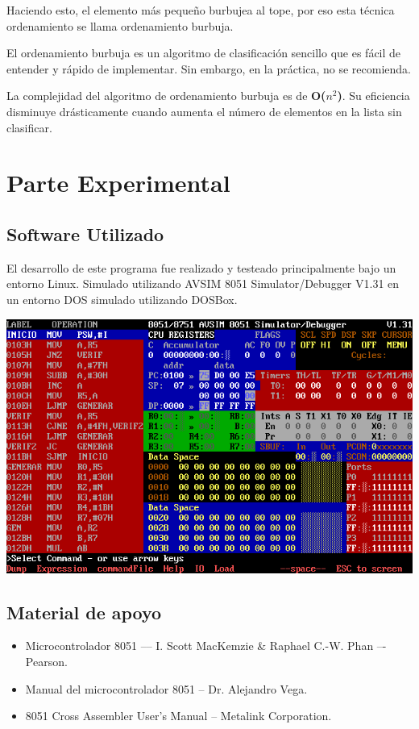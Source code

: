 \documentclass[doc, donotrepeattitle, biblatex, apacite]{apa6}
\begin{document}
Haciendo esto, el elemento más pequeño burbujea al tope, por eso esta técnica ordenamiento se
llama ordenamiento burbuja.

El ordenamiento burbuja es un algoritmo de clasificación sencillo que es fácil de entender y
rápido de implementar. Sin embargo, en la práctica, no se recomienda.

La complejidad del algoritmo de ordenamiento burbuja es de \textbf{O($n^{2}$)}. Su eficiencia disminuye
drásticamente cuando aumenta el número de elementos en la lista sin clasificar.
\newpage
\section{Parte Experimental}
\subsection{Software Utilizado}
El desarrollo de este programa fue realizado y testeado principalmente bajo un entorno Linux. Simulado utilizando AVSIM 8051 Simulator/Debugger V1.31 en un entorno DOS simulado utilizando DOSBox.
\begin{center}
\includegraphics[scale=0.5]{screenshot1}
\end{center}

\subsection{Material de apoyo}
\begin{itemize}
\item Microcontrolador 8051 --– I. Scott MacKemzie \& Raphael C.-W. Phan –- Pearson.
\item Manual del microcontrolador 8051 – Dr. Alejandro Vega.
\item 8051 Cross Assembler User’s Manual – Metalink Corporation.
\end{itemize}
\end{document}
